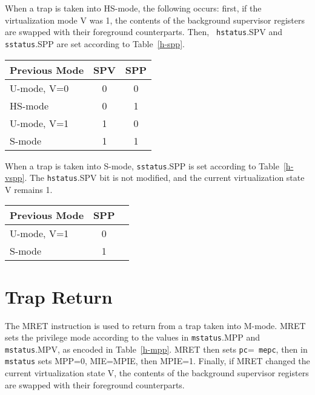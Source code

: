 When a trap is taken into HS-mode, the following occurs: first, if the
virtualization mode V was 1, the contents of the background supervisor
registers are swapped with their foreground counterparts.  Then, {\tt
hstatus}.SPV and {\tt sstatus}.SPP are set according to Table~\ref{h-spp}.

\begin{table*}[h!]
\begin{center}
\begin{tabular}{|l|c|c|}
  \hline
  Previous Mode & SPV & SPP \\ \hline
  U-mode, V=0   & 0   & 0   \\
  HS-mode       & 0   & 1   \\ \hline
  U-mode, V=1   & 1   & 0   \\
  S-mode        & 1   & 1   \\ \hline
\end{tabular}
\end{center}
\caption{Value of {\tt hstatus} field SPV and {\tt sstatus} field SPP after a trap into HS-mode.}
\label{h-spp}
\end{table*}

When a trap is taken into S-mode, {\tt sstatus}.SPP is set according to
Table~\ref{h-vspp}.  The {\tt hstatus}.SPV
bit is not modified, and the current virtualization state V remains 1.

\begin{table*}[h!]
\begin{center}
\begin{tabular}{|l|c|c|}
  \hline
  Previous Mode & SPP \\ \hline
  U-mode, V=1   & 0   \\
  S-mode        & 1   \\ \hline
\end{tabular}
\end{center}
\caption{Value of {\tt sstatus} field SPP after a trap into S-mode.}
\label{h-vspp}
\end{table*}

\section{Trap Return}

The MRET instruction is used to return from a trap taken into M-mode.  MRET sets the
privilege mode according to the values in {\tt mstatus}.MPP and {\tt
mstatus}.MPV, as encoded in Table~\ref{h-mpp}.  MRET then sets {\tt pc}={\tt
mepc}, then in {\tt mstatus} sets MPP=0, MIE=MPIE, then MPIE=1.  Finally, if
MRET changed the current virtualization state V, the contents of the
background supervisor registers are swapped with their foreground
counterparts.

